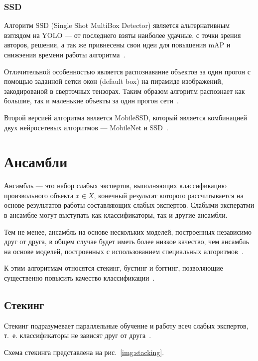 \subsubsection*{SSD}

Алгоритм SSD (Single Shot MultiBox Detector) является альтернативным взглядом на YOLO --- от последнего взяты наиболее удачные, с точки зрения авторов, решения, а так же привнесены свои идеи для повышения mAP и снижэения времени работы алгоритма~\cite{ssd}.

Отличительной особенностью является распознавание объектов за один прогон с помощью заданной сетки окон (default box) на пирамиде изображений, закодированой в сверточных тензорах. Таким образом алгоритм распознает как большие, так и маленькие объекты за один прогон сети~\cite{ssd}.

Второй версией алгоритма является MobileSSD, который является комбинацией двух нейросетевых алгоритмов --- MobileNet и SSD~\cite{mobile-ssd}.

\section{Ансамбли}

Ансамбль --- это набор слабых экспертов, выполняющих классификацию произвольного объекта $x \in X$, конечный результат которого рассчитывается на основе результатов работы составляющих слабых экспертов. Слабыми эксператми в ансамбле могут выступать как классификаторы, так и другие ансамбли.

Тем не менее, ансамбль на основе нескольких моделей, построенных независимо друг от друга, в общем случае будет иметь более низкое качество, чем ансамбль на основе моделей, построенных с использованием специальных алгоритмов~\cite{ensembles}.

К этим алгоритмам относятся стекинг, бустинг и бэггинг, позволяющие существенно повысить качество классификации~\cite{ensembles}.

\subsection{Стекинг}

Стекинг подразумевает параллельные обучение и работу всеч слабых экспертов, т.~е. классификаторы не зависят друг от друга~\cite{ensembles}. 

Схема стекинга представлена на рис.~\ref{img:stacking}.



